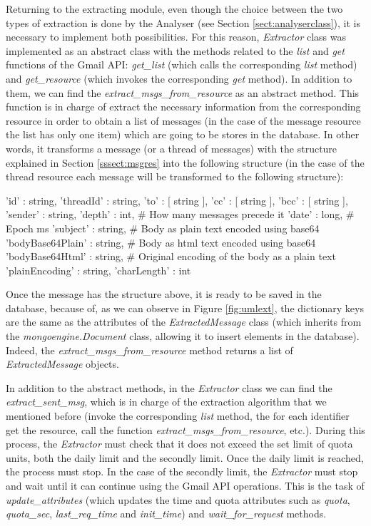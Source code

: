 Returning to the extracting module, even though the choice between the two types of extraction is done by the Analyser (see Section \ref{sect:analyserclass}), it is necessary to implement both possibilities. For this reason, \textit{Extractor} class was implemented as an abstract class with the methods related to the \textit{list} and \textit{get} functions of the Gmail API: \textit{get\_list} (which calls the corresponding \textit{list} method) and \textit{get\_resource} (which invokes the corresponding \textit{get} method). In addition to them, we can find the \textit{extract\_msgs\_from\_resource} as an abstract method. This function is in charge of extract the necessary information from the corresponding resource in order to obtain a list of messages (in the case of the message resource the list has only one item) which are going to be stores in the database. In other words, it transforms a message (or a thread of messages) with the structure explained in Section \ref{sssect:msgres} into the following structure (in the case of the thread resource each message will be transformed to the following structure):

\begin{python}
{
	'id' : string,
	'threadId' : string,
	'to' : [ string ],
	'cc' : [ string ],
	'bcc' : [ string ],
	'sender' : string,
	'depth' : int,               # How many messages precede it
	'date' : long,               # Epoch ms
	'subject' : string,
	# Body as plain text encoded using base64
	'bodyBase64Plain' : string,
	# Body as html text encoded using base64
	'bodyBase64Html' : string,
	# Original encoding of the body as a plain text
	'plainEncoding' : string,    
	'charLength' : int
}
\end{python}

Once the message has the structure above, it is ready to be saved in the database, because of, as we can observe in Figure \ref{fig:umlext}, the dictionary keys are the same as the attributes of the \textit{ExtractedMessage} class (which inherits from the \textit{mongoengine.Document} class, allowing it to insert elements in the database). Indeed, the \textit{extract\_msgs\_from\_resource} method returns a list of \textit{ExtractedMessage} objects.

In addition to the abstract methods, in the \textit{Extractor} class we can find the \textit{extract\_sent\_msg}, which is in charge of the extraction algorithm that we mentioned before (invoke the corresponding \textit{list} method, the for each identifier get the resource, call the function \textit{extract\_msgs\_from\_resource}, etc.). During this process, the \textit{Extractor} must check that it does not exceed the set limit of quota units, both the daily limit and the secondly limit. Once the daily limit is reached, the process must stop. In the case of the secondly limit, the \textit{Extractor} must stop and wait until it can continue using the Gmail API operations. This is the task of \textit{update\_attributes} (which updates the time and quota attributes such as \textit{quota}, \textit{quota\_sec}, \textit{last\_req\_time} and \textit{init\_time}) and \textit{wait\_for\_request} methods.

